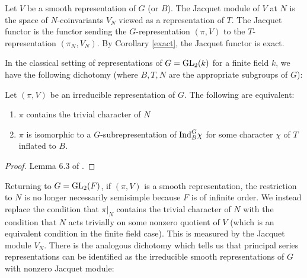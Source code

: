 \begin{defn}
    Let $V$ be a smooth representation of $G$ (or $B$). The Jacquet module of $V$ at $N$ is the space of $N$-coinvariants $V_N$ viewed as a representation of $T$. The Jacquet functor is the functor sending the $G$-representation $(\pi,V)$ to the $T$-representation $(\pi_N,V_N)$. By Corollary \ref{exact}, the Jacquet functor is exact.
\end{defn}

In the classical setting of representations of $G=\mathrm{GL}_2(k)$ for a finite field $k$, we have the following dichotomy (where $B,T,N$ are the appropriate subgroups of $G$):
\begin{lemma}
    Let $(\pi,V)$ be an irreducible representation of $G$. The following are equivalent:
    \begin{enumerate}
        \item $\pi$ contains the trivial character of $N$
        \item $\pi$ is isomorphic to a $G$-subrepresentation of $\mathrm{Ind}_B^G \chi$ for some character $\chi$ of $T$ inflated to $B$.
    \end{enumerate}
\end{lemma}
\begin{proof}
    Lemma 6.3 of \cite{BH1}.
\end{proof}

Returning to $G=\mathrm{GL}_2(F)$, if $(\pi,V)$ is a smooth representation, the restriction to $N$ is no longer necessarily semisimple because $F$ is of infinite order. We instead replace the condition that $\pi |_N$ contains the trivial character of $N$ with the condition that $N$ acts trivially on some nonzero quotient of $V$ (which is an equivalent condition in the finite field case). This is measured by the Jacquet module $V_N$. There is the analogous dichotomy which tells us that principal series representations can be identified as the irreducible smooth representations of $G$ with nonzero Jacquet module: 


